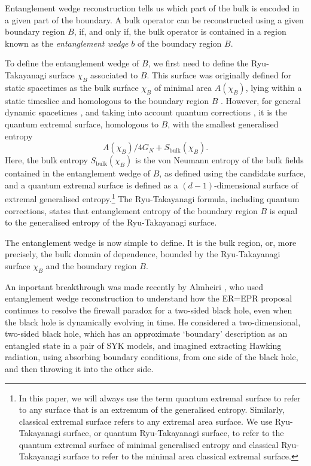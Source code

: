 \documentclass[12pt]{article}
\begin{document}
Entanglement wedge reconstruction tells us which part of the bulk is encoded in a given part of the boundary. A bulk operator can be reconstructed using a given boundary region $B$, if, and only if, the bulk operator is contained in a region known as the \emph{entanglement wedge} $b$ of the boundary region $B$. 

To define the entanglement wedge of $B$, we first need to define the Ryu-Takayanagi surface $\chi_B$ associated to $B$. This surface was originally defined for static spacetimes as the bulk surface $\chi_B$ of minimal area $A(\chi_B)$, lying within a static timeslice and homologous to the boundary region $B$ \cite{ryu2006holographic, headrick2007holographic}. However, for general dynamic spacetimes \cite{hubeny2007covariant}, and taking into account quantum corrections \cite{engelhardt2015quantum,dong2018entropy}, it is the quantum extremal surface, homologous to $B$, with the smallest generalised entropy $$A(\chi_B)/4G_N + S_\text{bulk}(\chi_B).$$ 
Here, the bulk entropy $S_\text{bulk}(\chi_B)$ is the von Neumann entropy of the bulk fields contained in the entanglement wedge of $B$, as defined using the candidate surface, and a quantum extremal surface is defined as a $(d-1)$-dimensional surface of extremal generalised entropy.\footnote{In this paper, we will always use the term quantum extremal surface to refer to any surface that is an extremum of the generalised entropy. Similarly, classical extremal surface refers to any extremal area surface. We use Ryu-Takayanagi surface, or quantum Ryu-Takayanagi surface, to refer to the quantum extremal surface of minimal generalised entropy and classical Ryu-Takayanagi surface to refer to the minimal area classical extremal surface.} The Ryu-Takayanagi formula, including quantum corrections, states that entanglement entropy of the boundary region $B$ is equal to the generalised entropy of the Ryu-Takayanagi surface. 

The entanglement wedge is now simple to define. It is the bulk region, or, more precisely, the bulk domain of dependence, bounded by the Ryu-Takayanagi surface $\chi_B$ and the boundary region $B$.

An inportant breakthrough was made recently by Almheiri \cite{almheiri2018holographic}, who used entanglement wedge reconstruction to understand how the ER=EPR proposal continues to resolve the firewall paradox for a two-sided black hole, even when the black hole is dynamically evolving in time. He considered a two-dimensional, two-sided black hole, which has an approximate `boundary' description as an entangled state in a pair of SYK models, and imagined extracting Hawking radiation, using absorbing boundary conditions, from one side of the black hole, and then throwing it into the other side. 
\end{document}
